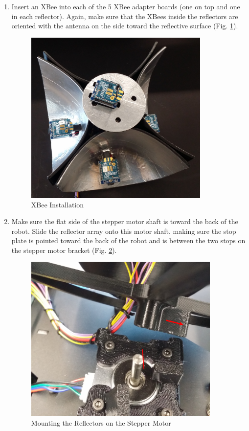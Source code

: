 \begin{enumerate}[label = \textbf{Step \arabic*.}]
    \item Insert an XBee into each of the 5 XBee adapter boards (one on top and one in each reflector). Again, make sure that the XBees inside the reflectors are oriented with the antenna on the side toward the reflective surface (Fig. \ref{fig:XBeeInstallation}).
    \begin{figure}[H]
        \centering
        \includegraphics[width=3.6in]{figs/img/assembly/27-XBeeInstallation.jpg}
        \caption{XBee Installation}
        \label{fig:XBeeInstallation}
    \end{figure}
    \pagebreak

    \item Make sure the flat side of the stepper motor shaft is toward the back of the robot. Slide the reflector array onto this motor shaft, making sure the stop plate is pointed toward the back of the robot and is between the two stops on the stepper motor bracket (Fig. \ref{fig:reflectorMounting}).
    \begin{figure}[H]
        \centering
        \includegraphics[width=3.8in]{figs/img/assembly/28-reflectorMounting.png}
        \caption{Mounting the Reflectors on the Stepper Motor}
        \label{fig:reflectorMounting}
    \end{figure}


\end{enumerate}
